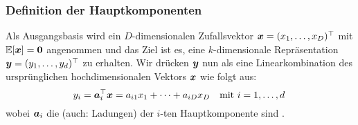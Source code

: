 \subsubsection{Definition der Hauptkomponenten}
\label{ch:MethodenDerDimRed:statistisch:PCA:Definition}
Als Ausgangsbasis wird ein $D$-dimensionalen Zufallsvektor $\bm{x} = (x_1, \ldots, x_D)^\top$ mit $\operatorname{\mathbb{E}}[\bm{x}] = \bm{0}$ angenommen und das Ziel ist es, eine $k$-dimensionale Repräsentation $\bm{y} = (y_1,\ldots,y_d)^\top$ zu erhalten. Wir drücken $\bm{y}$ nun als eine Linearkombination des ursprünglichen hochdimensionalen Vektors $\bm{x}$ wie folgt aus:
\begin{equation}
	y_i = \bm{a}_i^\top \bm{x} = a_{i1} x_1 + \cdots + a_{iD} x_D
	\quad \text{mit } i = 1,\ldots,d \,
\end{equation}
wobei $\bm{a}_i$ die  (auch: Ladungen) der $i$-ten Hauptkomponente sind \parencite[vgl.][2]{Jolliffe.2002}.


